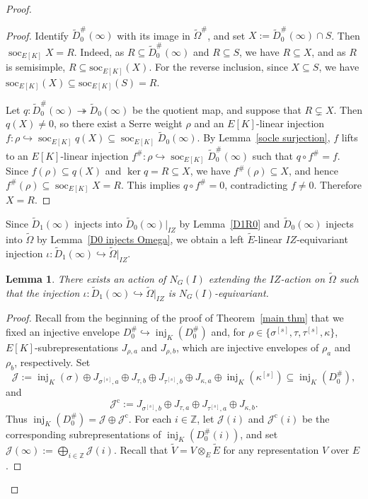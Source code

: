 \documentclass[a4paper,10pt,twoside]{amsart}
\newtheorem{lemma}[theorem]{Lemma}
\theoremstyle{definition}
\numberwithin{equation}{section}
\begin{document}
\begin{proof}
\begin{proof}
Identify \(\widetilde D_0^\#(\infty)\) with its image in
\(\widetilde\Omega^\#\), and set $X:=\widetilde D_0^\#(\infty)\cap S$. Then \(\operatorname{soc}_{E[K]}X=R\). Indeed, as $R \subseteq \widetilde{D}_0^\#(\infty)$ and 
$R \subseteq S$, we have $R \subseteq X$, and as $R$ is semisimple, 
$R \subseteq \mathrm{soc}_{E[K]}(X)$. For the reverse inclusion, 
since $X \subseteq S$, we have 
$\mathrm{soc}_{E[K]}(X) \subseteq \mathrm{soc}_{E[K]}(S) = R$.

Let
\(q:\widetilde D_0^\#(\infty)\twoheadrightarrow
\widetilde D_0(\infty)\)
be the quotient map, and suppose that \(R\subsetneq X\).
Then \(q(X)\neq0\), so there exist a Serre weight \(\rho\) and an $E[K]$-linear injection $f:\rho\hookrightarrow
\operatorname{soc}_{E[K]}q(X)
\subseteq \operatorname{soc}_{E[K]}\widetilde D_0(\infty).
$ By Lemma~\ref{socle surjection}, \(f\) lifts to an $E[K]$-linear injection $f^\#:\rho\hookrightarrow
\operatorname{soc}_{E[K]}\widetilde D_0^\#(\infty)
$ such that \(q\circ f^\#=f\).
Since $f(\rho)\subseteq q(X)$ and \(\ker q=R\subseteq X\), we have
\(f^\#(\rho)\subseteq X\), and hence $f^\#(\rho)\subseteq\operatorname{soc}_{E[K]}X=R$. This implies \(q\circ f^\#=0\), contradicting \(f\neq0\).
Therefore \(X=R\).
\end{proof} 

 
Since $\widetilde{D}_1(\infty)$ injects into $\widetilde{D}_0(\infty)|_{IZ}$ 
by Lemma~\ref{D1R0} and $\widetilde{D}_0(\infty)$ injects into 
$\widetilde{\Omega}$ by Lemma~\ref{D0 injects Omega}, we obtain a left \(\widetilde E\)-linear \(IZ\)-equivariant injection $\iota : \widetilde{D}_1(\infty) \hookrightarrow 
\widetilde{\Omega}|_{IZ}$. 
 
\begin{lemma}\label{N-action lemma}
There exists an action of \(N_G(I)\) 
extending the \(IZ\)-action on \(\widetilde{\Omega}\) such that the injection
\(
\iota:\widetilde D_1(\infty)
\hookrightarrow
\widetilde{\Omega}|_{IZ}
\)
is \(N_G(I)\)-equivariant.
\end{lemma}

\begin{proof}
Recall from the beginning of the proof of Theorem~\ref{main thm} that we
fixed an injective envelope \(D_0^\#\hookrightarrow\operatorname{inj}_K(D_0^\#)\) and, for \(\rho\in\{\sigma^{[s]},\tau,\tau^{[s]},\kappa\}\), \(E[K]\)-subrepresentations
\(J_{\rho,a}\) and \(J_{\rho,b}\), which are injective envelopes of
\(\rho_a\) and \(\rho_b\), respectively. Set
$$
\mathcal J:=
\operatorname{inj}_K(\sigma)
\oplus J_{\sigma^{[s]},a}
\oplus J_{\tau,b}
\oplus J_{\tau^{[s]},b}
\oplus J_{\kappa,a}
\oplus\operatorname{inj}_K(\kappa^{[s]})
\subseteq \operatorname{inj}_K(D_0^\#),
$$
and
$$
\mathcal J^{\mathrm c}:=
J_{\sigma^{[s]},b}
\oplus J_{\tau,a}
\oplus J_{\tau^{[s]},a}
\oplus J_{\kappa,b}.
$$
Thus $\operatorname{inj}_K(D_0^\#)=\mathcal J\oplus\mathcal J^{\mathrm c}$. For each \(i\in\mathbb Z\), let \(\mathcal J(i)\) and
\(\mathcal J^{\mathrm c}(i)\) be the corresponding subrepresentations of
\(\operatorname{inj}_K(D_0^\#(i))\), and set
$\mathcal J(\infty):=\bigoplus_{i\in\mathbb Z}\mathcal J(i)$. Recall that \(\widetilde V=V\otimes_E\widetilde E\) for any representation \(V\) over \(E\).


\end{proof}
\end{proof}
\end{document}
